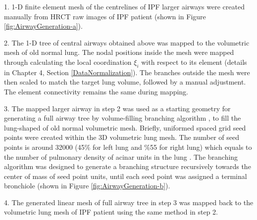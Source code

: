 1. 1-D finite element mesh of the centrelines of IPF larger airways were created manually from HRCT raw images of IPF patient (shown in Figure \ref{fig:AirwayGeneration-a}).

2. The 1-D tree of central airways obtained above was mapped to the volumetric mesh of old normal lung. The nodal positions inside the mesh were mapped through calculating the local coordination $\xi_{i}$ with respect to its element (details in Chapter 4, Section \ref{DataNormalization}). The branches outside the mesh were then scaled to match the target lung volume, followed by a manual adjustment. The element connectivity remains the same during mapping.

3. The mapped larger airway in step 2 was used as a starting geometry for generating a full airway tree by volume-filling branching algorithm \citep{tawhai2000generation, tawhai2004ct}, to fill the lung-shaped of old normal volumetric mesh. Briefly, uniformed spaced grid seed points were created within the 3D volumetric lung mesh. The number of seed points is around 32000 (45\% for left lung and \%55 for right lung) which equals to the number of pulmonary density of acinar units in the lung \citep{haefeli1988morphometry}. The branching algorithm was designed to generate a branching structure recursively towards the center of mass of seed point units, until each seed point was assigned a terminal bronchiole (shown in Figure \ref{fig:AirwayGeneration-b}). 

4. The generated linear mesh of full airway tree in step 3 was mapped back to the volumetric lung mesh of IPF patient using the same method in step 2.

